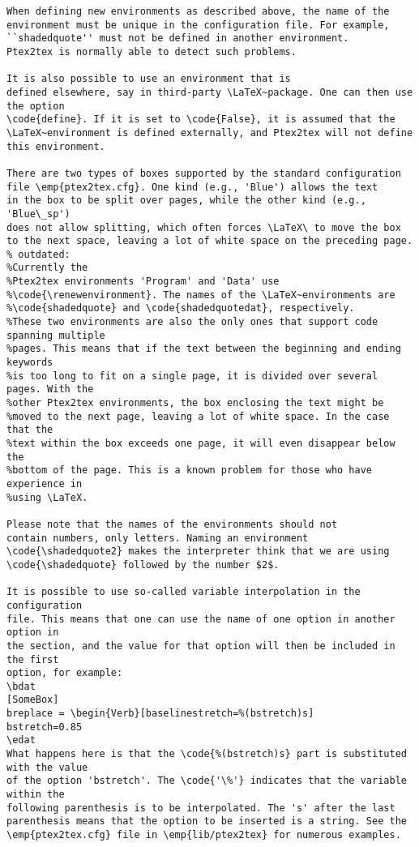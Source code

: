 \documentclass[a4paper,11pt]{article}
\begin{document}
{\begin{Verbatim}
When defining new environments as described above, the name of the
environment must be unique in the configuration file. For example,
``shadedquote'' must not be defined in another environment.
Ptex2tex is normally able to detect such problems.

It is also possible to use an environment that is
defined elsewhere, say in third-party \LaTeX~package. One can then use the option
\code{define}. If it is set to \code{False}, it is assumed that the
\LaTeX~environment is defined externally, and Ptex2tex will not define
this environment.

There are two types of boxes supported by the standard configuration
file \emp{ptex2tex.cfg}. One kind (e.g., 'Blue') allows the text
in the box to be split over pages, while the other kind (e.g., 'Blue\_sp')
does not allow splitting, which often forces \LaTeX\ to move the box
to the next space, leaving a lot of white space on the preceding page.
% outdated:
%Currently the
%Ptex2tex environments 'Program' and 'Data' use
%\code{\renewenvironment}. The names of the \LaTeX~environments are
%\code{shadedquote} and \code{shadedquotedat}, respectively.
%These two environments are also the only ones that support code spanning multiple
%pages. This means that if the text between the beginning and ending keywords
%is too long to fit on a single page, it is divided over several pages. With the
%other Ptex2tex environments, the box enclosing the text might be
%moved to the next page, leaving a lot of white space. In the case that the
%text within the box exceeds one page, it will even disappear below the
%bottom of the page. This is a known problem for those who have experience in
%using \LaTeX.

Please note that the names of the environments should not
contain numbers, only letters. Naming an environment
\code{\shadedquote2} makes the interpreter think that we are using
\code{\shadedquote} followed by the number $2$.

It is possible to use so-called variable interpolation in the configuration
file. This means that one can use the name of one option in another option in
the section, and the value for that option will then be included in the first
option, for example:
\bdat
[SomeBox]
breplace = \begin{Verb}[baselinestretch=%(bstretch)s]
bstretch=0.85
\edat
What happens here is that the \code{%(bstretch)s} part is substituted with the value
of the option 'bstretch'. The \code{'\%'} indicates that the variable within the
following parenthesis is to be interpolated. The 's' after the last
parenthesis means that the option to be inserted is a string. See the
\emp{ptex2tex.cfg} file in \emp{lib/ptex2tex} for numerous examples.


\end{Verbatim}}
\end{document}
